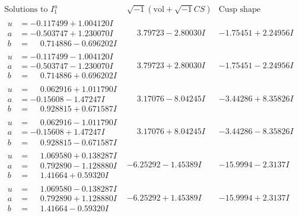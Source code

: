 \documentclass[1p]{elsarticle_modified}
\theoremstyle{definition}
\newcommand{\I}{\sqrt{-1}}
\begin{document}
$$\begin{array}{c|c|c}  
\text{Solutions to }I^u_{1}& \I (\text{vol} + \sqrt{-1}CS) & \text{Cusp shape}\\
 \hline 
\begin{aligned}
u &= -0.117499 + 1.004120 I \\
a &= -0.503747 + 1.230070 I \\
b &= \phantom{-}0.714886 - 0.696202 I\end{aligned}
 & \phantom{-}3.79723 - 2.80030 I & -1.75451 + 2.24956 I \\ \hline\begin{aligned}
u &= -0.117499 - 1.004120 I \\
a &= -0.503747 - 1.230070 I \\
b &= \phantom{-}0.714886 + 0.696202 I\end{aligned}
 & \phantom{-}3.79723 + 2.80030 I & -1.75451 - 2.24956 I \\ \hline\begin{aligned}
u &= \phantom{-}0.062916 + 1.011790 I \\
a &= -0.15608 - 1.47247 I \\
b &= \phantom{-}0.928815 + 0.671587 I\end{aligned}
 & \phantom{-}3.17076 - 8.04245 I & -3.44286 + 8.35826 I \\ \hline\begin{aligned}
u &= \phantom{-}0.062916 - 1.011790 I \\
a &= -0.15608 + 1.47247 I \\
b &= \phantom{-}0.928815 - 0.671587 I\end{aligned}
 & \phantom{-}3.17076 + 8.04245 I & -3.44286 - 8.35826 I \\ \hline\begin{aligned}
u &= \phantom{-}1.069580 + 0.138287 I \\
a &= \phantom{-}0.792890 - 1.128880 I \\
b &= \phantom{-}1.41664 + 0.59320 I\end{aligned}
 & -6.25292 - 1.45389 I & -15.9994 - 2.3137 I \\ \hline\begin{aligned}
u &= \phantom{-}1.069580 - 0.138287 I \\
a &= \phantom{-}0.792890 + 1.128880 I \\
b &= \phantom{-}1.41664 - 0.59320 I\end{aligned}
 & -6.25292 + 1.45389 I & -15.9994 + 2.3137 I \\ \hline\begin{aligned}

\end{aligned}
\end{array}$$
\end{document}
